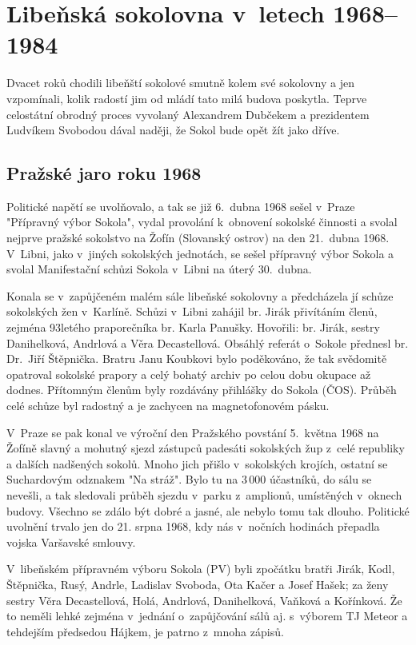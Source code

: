 \documentclass[a5paper, 11pt, twoside]{article}
\begin{document}
\section{Libeňská sokolovna v~letech
1968--1984}

Dvacet roků chodili libeňští sokolové smutně kolem své sokolovny a jen
vzpomínali, kolik radostí jim od mládí tato milá budova poskytla. Teprve
celostátní obrodný proces vyvolaný Alexandrem Dubčekem a prezidentem
Ludvíkem Svobodou dával naději, že Sokol bude opět žít jako dříve.

\subsection{Pražské jaro roku 1968}

Politické napětí se uvolňovalo, a tak se již 6.~dubna 1968 sešel v~Praze
"Přípravný výbor Sokola", vydal provolání k~obnovení sokolské činnosti
a svolal nejprve pražské sokolstvo na Žofín (Slovanský ostrov) na den
21.~dubna 1968. V~Libni, jako v~jiných sokolských jednotách, se sešel
přípravný výbor Sokola a svolal Manifestační schůzi Sokola v~Libni na
úterý 30.~dubna.

{\sloppy Konala se v~zapůjčeném malém sále libeňské sokolovny a předcházela jí
schůze sokolských žen v~Karlíně. Schůzi v~Libni zahájil br. Jirák
přivítáním členů, zejména 93letého praporečníka br. Karla Panušky.
Hovořili: br. Jirák, sestry Danihelková, Andrlová a Věra Decastellová.
Obsáhlý referát o~Sokole přednesl br. Dr.~Jiří Štěpnička. Bratru Janu
Koubkovi bylo poděkováno, že tak svědomitě opatroval sokolské prapory a
celý bohatý archiv po celou dobu okupace až dodnes. Přítomným členům
byly rozdávány přihlášky do Sokola (ČOS). Průběh celé schůze byl
radostný a je zachycen na magnetofonovém pásku.\par}

V~Praze se pak konal ve výroční den Pražského povstání 5.~května 1968 na
Žofíně slavný a mohutný sjezd zástupců padesáti sokolských žup z~celé
republiky a dalších nadšených sokolů. Mnoho jich přišlo v~sokolských
krojích, ostatní se Suchardovým odznakem "Na stráž". Bylo tu na 3\,000
účastníků, do sálu se nevešli, a tak sledovali průběh sjezdu v~parku
z~amplionů, umístěných v~oknech budovy. Všechno se zdálo být dobré a
jasné, ale nebylo tomu tak dlouho. Politické uvolnění trvalo jen do 21.
srpna 1968, kdy nás v~nočních hodinách přepadla vojska Varšavské
smlouvy.

V~libeňském přípravném výboru Sokola (PV) byli zpočátku bratři Jirák,
Kodl, Štěpnička, Rusý, Andrle, Ladislav Svoboda, Ota Kačer a Josef
Hašek; za ženy sestry Věra Decastellová, Holá, Andrlová, Danihelková,
Vaňková a Kořínková. Že to neměli lehké zejména v~jednání o~zapůjčování
sálů aj. s~výborem TJ Meteor a tehdejším předsedou Hájkem, je patrno
z~mnoha zápisů.
\end{document}
